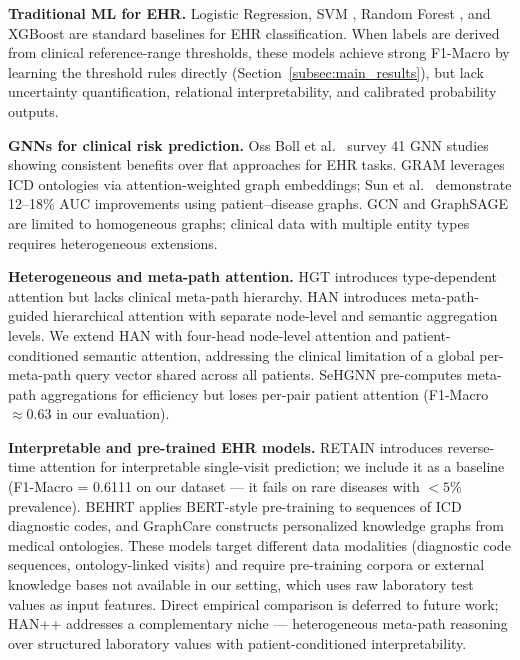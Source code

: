 \documentclass[conference]{IEEEtran}
\begin{document}
\textbf{Traditional ML for EHR.}
Logistic Regression, SVM \cite{cortes_1995}, Random Forest \cite{breiman_2001},
and XGBoost \cite{chen_2016} are standard baselines for EHR classification.
When labels are derived from clinical reference-range thresholds, these models
achieve strong F1-Macro by learning the threshold rules directly
(Section~\ref{subsec:main_results}), but lack uncertainty quantification,
relational interpretability, and calibrated probability outputs.

\textbf{GNNs for clinical risk prediction.}
Oss Boll et al.\ \cite{oss_boll_2024} survey 41 GNN studies showing consistent
benefits over flat approaches for EHR tasks.
GRAM \cite{choi_2017} leverages ICD ontologies via attention-weighted graph
embeddings; Sun et al.\ \cite{sun_2021} demonstrate 12--18\% AUC improvements
using patient--disease graphs.
GCN \cite{kipf_2017} and GraphSAGE \cite{hamilton_2017} are limited to
homogeneous graphs; clinical data with multiple entity types requires
heterogeneous extensions.

\textbf{Heterogeneous and meta-path attention.}
HGT \cite{hu_2020} introduces type-dependent attention but lacks clinical
meta-path hierarchy.
HAN \cite{wang_2019} introduces meta-path-guided hierarchical attention with
separate node-level and semantic aggregation levels.
We extend HAN with four-head node-level attention and patient-conditioned
semantic attention, addressing the clinical limitation of a global per-meta-path
query vector shared across all patients.
SeHGNN \cite{yang_2023} pre-computes meta-path aggregations for efficiency but
loses per-pair patient attention (F1-Macro $\approx 0.63$ in our evaluation).

\textbf{Interpretable and pre-trained EHR models.}
RETAIN \cite{choi_2016_retain} introduces reverse-time attention for
interpretable single-visit prediction; we include it as a baseline
(F1-Macro = 0.6111 on our dataset --- it fails on rare diseases with
$< 5\%$ prevalence).
BEHRT \cite{li_behrt_2020} applies BERT-style pre-training to sequences
of ICD diagnostic codes, and GraphCare \cite{jiang_graphcare_2024}
constructs personalized knowledge graphs from medical ontologies.
These models target different data modalities (diagnostic code sequences,
ontology-linked visits) and require pre-training corpora or external
knowledge bases not available in our setting, which uses raw laboratory
test values as input features.
Direct empirical comparison is deferred to future work; HAN++ addresses a
complementary niche --- heterogeneous meta-path reasoning over structured
laboratory values with patient-conditioned interpretability.
\end{document}

